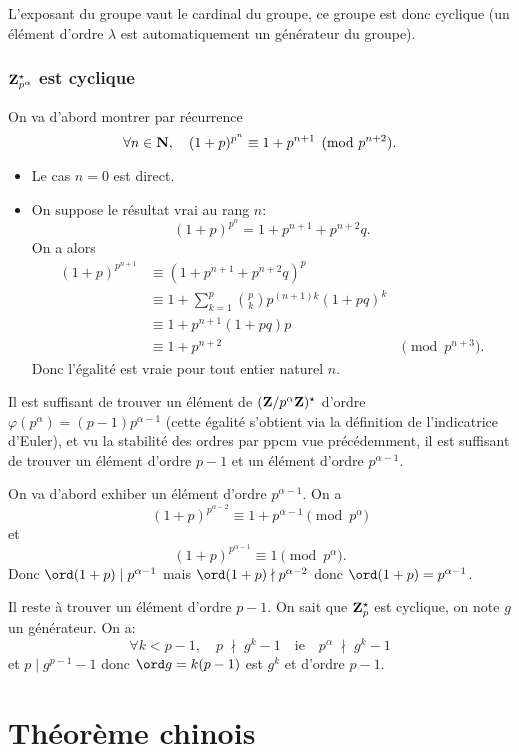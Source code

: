 L'exposant du groupe vaut le cardinal du groupe, ce groupe est donc cyclique (un élément d'ordre $\lambda$ est automatiquement un générateur du groupe).

\subsubsection{$\mathbf Z_{p^\alpha}^\star$ est cyclique}

On va d'abord montrer par récurrence \[
    \forall n\in\mathbf N, \quad (1+p)^{p^n}\equiv 1+p^{n+1}\pmod {p^{n+2}}.
\]

\begin{itemize}
    \item Le cas $n=0$ est direct.
    \item On suppose le résultat vrai au rang $n$: \[
        (1+p)^{p^n}=1+p^{n+1}+p^{n+2}q.
    \]
    On a alors \begin{align*}
        (1+p)^{p^{n+1}}&\equiv(1+p^{n+1}+p^{n+2}q)^p\\
                       &\equiv 1+\sum_{k=1}^{p}\binom pk p^{(n+1)k}(1+pq)^k\\ 
                       &\equiv 1 + p^{n+1}(1+pq)p \\
                       &\equiv 1+p^{n+2}&\pmod{p^{n+3}}.
    \end{align*}
    Donc l'égalité est vraie pour tout entier naturel $n$.
\end{itemize}
Il est suffisant de trouver un élément de $(\mathbf Z/p^\alpha\mathbf Z)^\star$ d'ordre $\varphi(p^\alpha)=(p-1)p^{\alpha-1}$ (cette égalité s'obtient via la définition de l'indicatrice d'Euler), et vu la stabilité des ordres par ppcm vue précédemment, il est suffisant de trouver un élément d'ordre $p-1$ et un élément d'ordre $p^{\alpha-1}$.

On va d'abord exhiber un élément d'ordre $p^{\alpha-1}$. On a 
\[
(1+p)^{p^{\alpha-2}} 
\equiv 1+p^{\alpha-1}\pmod {p^\alpha}    \]
et \[
    (1+p)^{p^{\alpha-1}}\equiv 1\pmod {p^\alpha}.
\]
Donc $\ord(1+p)\mid p^{\alpha-1}$ mais $\ord(1+p)\nmid p^{\alpha-2}$ donc $\ord(1+p)=p^{\alpha-1}$.

Il reste à trouver un élément d'ordre $p-1$. On sait que $\mathbf Z_p^\star$ est cyclique, on note $g$ un générateur. On a:
\[
    \forall k<p-1, \quad p\;\nmid\;g^k-1\quad \text{ie}\quad p^\alpha\;\nmid\; g^k-1
\]
et $p\mid g^{p-1}-1$ donc $\ord g=k(p-1)$ est $g^k$ et d'ordre $p-1$.

\section{Théorème chinois}

